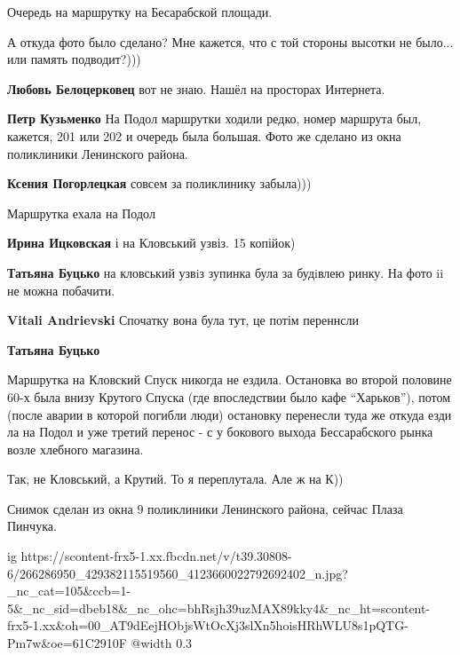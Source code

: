  
 
 
 
 

Очередь на маршрутку на Бесарабской площади.

А откуда фото было сделано? Мне кажется, что с той стороны высотки не было...
или память подводит?)))

\textbf{Любовь Белоцерковец} вот не знаю. Нашёл на просторах Интернета.

\textbf{Петр Кузьменко} На Подол маршрутки ходили редко, номер маршрута был, кажется, 201 или 202 и очередь была большая. Фото же сделано из окна поликлиники Ленинского района.

\textbf{Ксения Погорлецкая} совсем за поликлинику забыла)))

Маршрутка ехала на Подол

\textbf{Ирина Ицковская} і на Кловський узвіз. 15 копійок)

\textbf{Татьяна Буцько} на кловський узвiз зупинка була за будiвлею ринку. На фото ii не можна побачити.

\textbf{Vitali Andrievski} Спочатку вона була тут, це потім переннсли

\textbf{Татьяна Буцько} 

Маршрутка на Кловский Спуск никогда не ездила. Остановка во второй половине
60-х была внизу Крутого Спуска (где впоследствии было кафе \enquote{Харьков}), потом
(после аварии в которой погибли люди) остановку перенесли туда же откуда езди
ла на Подол и уже третий перенос - с у бокового выхода Бессарабского рынка
возле хлебного магазина.

Так, не Кловський, а Крутий. То я переплутала. Але ж на К))

Снимок сделан из окна 9 поликлиники Ленинского района, сейчас Плаза Пинчука.

\ifcmt
  ig https://scontent-frx5-1.xx.fbcdn.net/v/t39.30808-6/266286950_429382115519560_4123660022792692402_n.jpg?_nc_cat=105&ccb=1-5&_nc_sid=dbeb18&_nc_ohc=bhRsjh39uzMAX89kky4&_nc_ht=scontent-frx5-1.xx&oh=00_AT9dEejHObjsWtOcXj3slXn5hoisHRhWLU8s1pQTG-Pm7w&oe=61C2910F
  @width 0.3
\fi

